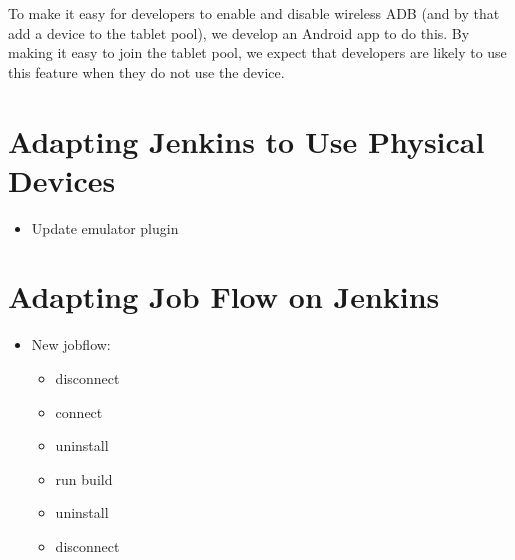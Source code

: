 To make it easy for developers to enable and disable wireless ADB (and by that add a device to the tablet pool), we develop an Android app to do this. By making it easy to join the tablet pool, we expect that developers are likely to use this feature when they do not use the device.

\section{Adapting Jenkins to Use Physical Devices}

\begin{itemize}
  \item Update emulator plugin
\end{itemize}

\section{Adapting Job Flow on Jenkins}

\begin{itemize}
  \item New jobflow:
  \begin{itemize}
    \item disconnect
    \item connect
    \item uninstall
    \item run build
    \item uninstall
    \item disconnect
  \end{itemize}
\end{itemize}